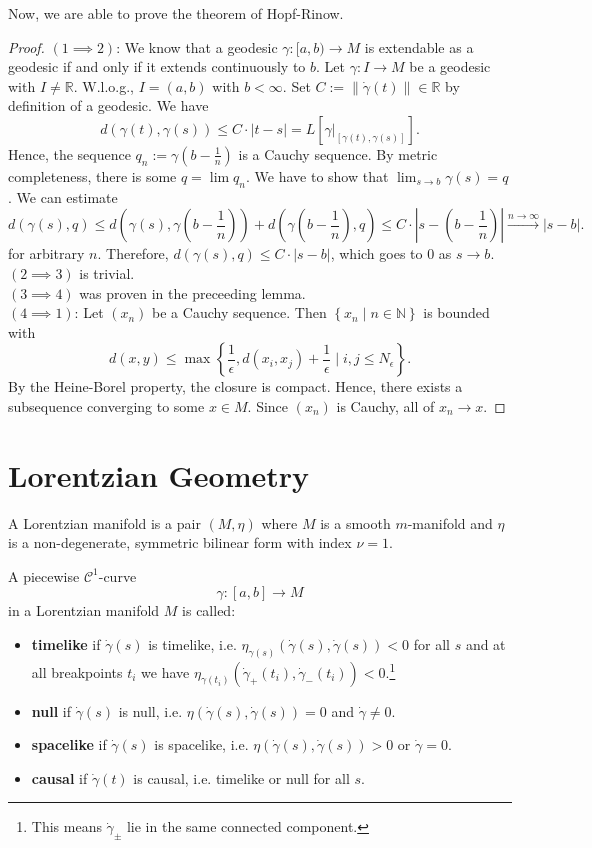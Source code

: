 Now, we are able to prove the theorem of Hopf-Rinow.
\begin{proof}
    $(1 \implies 2)$: We know that a geodesic $\gamma: [a,b) \to M$ is extendable as a geodesic if and only if it extends continuously to $b$. Let $\gamma: I \to M$ be a geodesic with $I \neq \mathbb{R}$. W.l.o.g., $I = (a,b)$ with $b<\infty$. Set $C:=\|\dot{\gamma}(t)\| \in \mathbb{R}$ by definition of a geodesic. We have \[
    d(\gamma(t),\gamma(s)) \leq C \cdot |t-s| = L[\gamma|_{[\gamma(t),\gamma(s)]}]
.\] Hence, the sequence $q_n := \gamma(b-\frac{1}{n})$ is a Cauchy sequence. By metric completeness, there is some $q=\lim q_n$. We have to show that $\lim_{s \to b} \gamma(s)=q$. We can estimate \[
d(\gamma(s),q) \leq d(\gamma(s),\gamma(b-\frac{1}{n}))+d(\gamma(b-\frac{1}{n}), q) \leq C \cdot \left|s-(b-\frac{1}{n})\right| \overset{n \to \infty}\to |s-b|
.\]  for arbitrary $n$. Therefore, $d(\gamma(s),q) \leq C \cdot |s-b|$, which goes to $0$ as $s \to b$.\\
$(2 \implies 3)$ is trivial.\\
$(3 \implies 4)$ was proven in the preceeding lemma.\\
$(4 \implies 1)$: Let $(x_n)$ be a Cauchy sequence. Then 
$\left\{x_n \mid n \in \mathbb{N}\right\} $
 is bounded with \[
d(x,y) \leq \max \left\{\frac{1}{\epsilon}, d(x_i,x_j)+\frac{1}{\epsilon} \mid i,j \leq N_\epsilon \right\} 
.\] By the Heine-Borel property, the closure is compact. Hence, there exists a subsequence converging to some $x \in M$. Since $(x_n)$ is Cauchy, all of $x_n \to x$.
\end{proof}
\section{Lorentzian Geometry}
\begin{definition}
    A Lorentzian manifold is a pair $(M, \eta)$ where $M$ is a smooth $m$-manifold and $\eta$ is a non-degenerate, symmetric bilinear form with index $\nu = 1$.
\end{definition}
\begin{definition}
    A piecewise $\mathcal{C}^1$-curve \[
        \gamma: [a,b] \to M
    \]  in a Lorentzian manifold $M$ is called:
    \begin{itemize}
        \item \textbf{timelike} if $\dot{\gamma}(s)$ is timelike, i.e. $\eta_{\gamma(s)}(\dot{\gamma}(s),\dot{\gamma}(s)) < 0$ for all $s$ and at all breakpoints $t_i$ we have $\eta_{\gamma(t_i)}(\dot{\gamma}_+(t_i),\dot{\gamma}_-(t_i)) < 0$.\footnote{This means $\dot{\gamma}_\pm$ lie in the same connected component.}
        \item \textbf{null} if $\dot{\gamma}(s)$ is null, i.e. $\eta(\dot{\gamma}(s),\dot{\gamma}(s))=0$ and $\dot{\gamma}\neq 0$.
        \item \textbf{spacelike} if $\dot{\gamma}(s)$ is spacelike, i.e. $\eta(\dot{\gamma}(s),\dot{\gamma}(s))> 0$ or $\dot{\gamma}=0$.
        \item \textbf{causal} if $\dot{\gamma}(t)$ is causal, i.e. timelike or null for all $s$.
    \end{itemize}
\end{definition}
